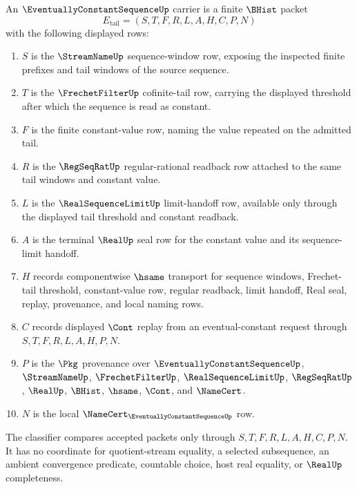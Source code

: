 \begin{definition}
\label{def:eventually-constant-sequence-carrier}
An $\EventuallyConstantSequenceUp$ carrier is a finite $\BHist$ packet
$$
E_{\mathrm{tail}}=(S,T,F,R,L,A,H,C,P,N)
$$
with the following displayed rows:
\begin{enumerate}
\item $S$ is the $\StreamNameUp$ sequence-window row, exposing the inspected finite prefixes and tail windows of the source sequence.
\item $T$ is the $\FrechetFilterUp$ cofinite-tail row, carrying the displayed threshold after which the sequence is read as constant.
\item $F$ is the finite constant-value row, naming the value repeated on the admitted tail.
\item $R$ is the $\RegSeqRatUp$ regular-rational readback row attached to the same tail windows and constant value.
\item $L$ is the $\RealSequenceLimitUp$ limit-handoff row, available only through the displayed tail threshold and constant readback.
\item $A$ is the terminal $\RealUp$ seal row for the constant value and its sequence-limit handoff.
\item $H$ records componentwise $\hsame$ transport for sequence windows, Frechet-tail threshold, constant-value row, regular readback, limit handoff, Real seal, replay, provenance, and local naming rows.
\item $C$ records displayed $\Cont$ replay from an eventual-constant request through $S,T,F,R,L,A,H,P,N$.
\item $P$ is the $\Pkg$ provenance over $\EventuallyConstantSequenceUp$, $\StreamNameUp$, $\FrechetFilterUp$, $\RealSequenceLimitUp$, $\RegSeqRatUp$, $\RealUp$, $\BHist$, $\hsame$, $\Cont$, and $\NameCert$.
\item $N$ is the local $\NameCert_{\EventuallyConstantSequenceUp}$ row.
\end{enumerate}
The classifier compares accepted packets only through $S,T,F,R,L,A,H,C,P,N$. It has no coordinate for quotient-stream equality, a selected subsequence, an ambient convergence predicate, countable choice, host real equality, or $\RealUp$ completeness.
\end{definition}

